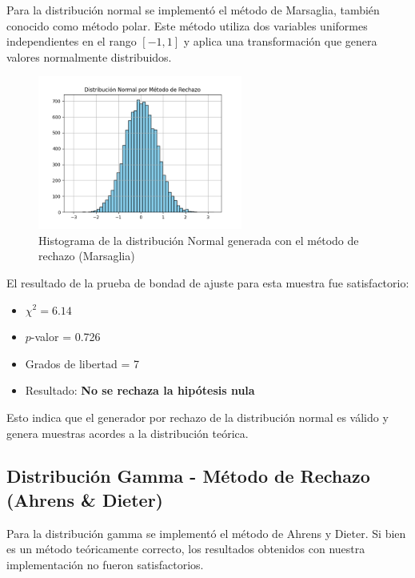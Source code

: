 \documentclass[11pt]{article}
\begin{document}
Para la distribución normal se implementó el método de Marsaglia, también conocido como método polar. 
Este método utiliza dos variables uniformes independientes en el rango $[-1, 1]$ y aplica una transformación que genera valores normalmente distribuidos.

\begin{figure}[H]
    \centering
    \includegraphics[width=0.6\textwidth]{Images/normal_rechazo.png}
    \caption{Histograma de la distribución Normal generada con el método de rechazo (Marsaglia)}
\end{figure}

El resultado de la prueba de bondad de ajuste para esta muestra fue satisfactorio:

\begin{itemize}
    \item $\chi^2 = 6.14$
    \item $p$-valor = 0.726
    \item Grados de libertad = 7
    \item Resultado: \textbf{No se rechaza la hipótesis nula}
\end{itemize}

Esto indica que el generador por rechazo de la distribución normal es válido y genera muestras acordes a la distribución teórica.

\subsection*{Distribución Gamma - Método de Rechazo (Ahrens \& Dieter)}

Para la distribución gamma se implementó el método de Ahrens y Dieter. Si bien es un método teóricamente correcto, los resultados obtenidos con nuestra implementación no fueron satisfactorios.
\end{document}

